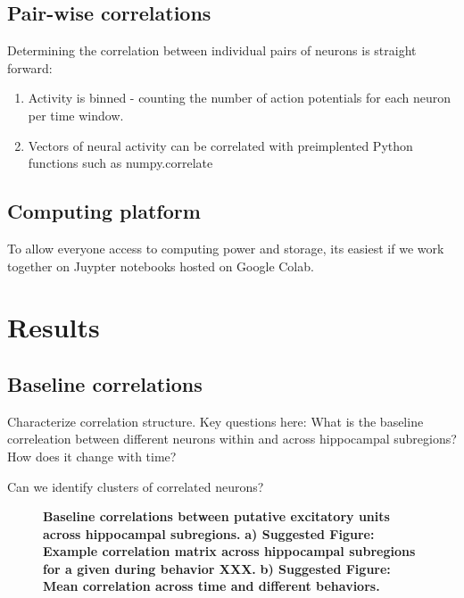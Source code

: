 \documentclass{article}
\begin{document}
\subsection{Pair-wise correlations}
Determining the correlation between individual pairs of neurons is straight forward: 
\begin{enumerate}
    \item Activity is binned - counting the number of action potentials for each neuron per time window.
    \item Vectors of neural activity can be correlated with preimplented Python functions such as numpy.correlate
\end{enumerate} 

\subsection{Computing platform}
To allow everyone access to computing power and storage, its easiest if we work together on Juypter notebooks hosted on Google Colab.

\section{Results}
\subsection{Baseline correlations}
Characterize correlation structure. Key questions here: What is the baseline correleation between different neurons within and across hippocampal subregions? How does it change with time?

Can we identify clusters of correlated neurons? 

\begin{figure}[H]
 \centering
  \begin{subfigure}[b]{0.9\textwidth}
     \centering
     
     \caption{}
     \label{fig:SeqComp_ActivationFunction}
 \end{subfigure}
  \begin{subfigure}[b]{0.9\textwidth}
     \centering
     
     \caption{}
     \label{fig:SeqComp_ActivationFunction}
 \end{subfigure}
 \hfill     
    \caption{
    \textbf{Baseline correlations between putative excitatory units across hippocampal subregions.}
    \textbf{a) Suggested Figure: Example correlation matrix across hippocampal subregions for a given during behavior XXX.  }
    \textbf{b) Suggested Figure: Mean correlation across time and different behaviors.  }
}
    \label{fig:SeqComp_SingleSequence}
\end{figure}
\end{document}
